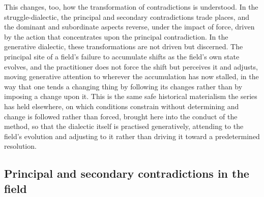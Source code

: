 
This changes, too, how the transformation of contradictions is understood. In the struggle-dialectic, the principal and secondary contradictions trade places, and the dominant and subordinate aspects reverse, under the impact of force, driven by the action that concentrates upon the principal contradiction. In the generative dialectic, these transformations are not driven but discerned. The principal site of a field's failure to accumulate shifts as the field's own state evolves, and the practitioner does not force the shift but perceives it and adjusts, moving generative attention to wherever the accumulation has now stalled, in the way that one tends a changing thing by following its changes rather than by imposing a change upon it. This is the same safe historical materialism the series has held elsewhere, on which conditions constrain without determining and change is followed rather than forced, brought here into the conduct of the method, so that the dialectic itself is practised generatively, attending to the field's evolution and adjusting to it rather than driving it toward a predetermined resolution.

\subsection{Principal and secondary contradictions in the field}
\label{p22:sub:method-principal-secondary}

